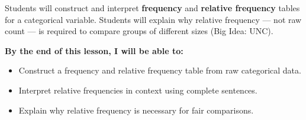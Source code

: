 \documentclass[aspectratio=169, 11pt]{beamer}
\begin{document}
{
\begin{frame}[t, plain]
  \vspace{0.45cm}\par
  \hspace{0.55cm}%
  \begin{minipage}{0.9\textwidth}


    \normalsize
    Students will construct and interpret \textbf{frequency} and
    \textbf{relative frequency} tables for a categorical variable.
    Students will explain why relative frequency --- not raw count --- is
    required to compare groups of different sizes (Big Idea: UNC).

    \vspace{0.45cm}

    \normalsize\textbf{\color{navy}By the end of this lesson, I will be able to:}

    \smallskip
    \begin{itemize}
      \setlength{\itemsep}{0.3em}\setlength{\topsep}{0.2em}
      \item Construct a frequency and relative frequency table from raw categorical data.
      \item Interpret relative frequencies in context using complete sentences.
      \item Explain why relative frequency is necessary for fair comparisons.
    \end{itemize}

  \end{minipage}
\end{frame}
}
\end{document}

